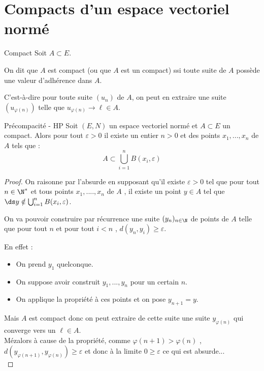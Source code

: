 \section{Compacts d'un espace vectoriel normé}

\begin{definition}{Compact}{}
    Soit $A \subset E$. 

    On dit que $A$ est compact (ou que $A$ est un compact) ssi toute suite de $A$ possède une 
    valeur d'adhérence dans $A$.

    \avspace C'est-à-dire pour toute suite $(u_n)$ de $A$, on peut en extraire une suite 
    $(u_{\varphi(n)})$ telle que $u_{\varphi(n)} \to \ell \in A$.
\end{definition}

\begin{proposition}{Précompacité - HP}{}
Soit $(E,N)$ un espace vectoriel normé et $A\subset E$ un compact.
Alors pour tout $\varepsilon >0$ il existe un entier $n>0$ et des points $x_1,...,x_n$ de $A$ tels que :
\[A \subset \bigcup_{i=1}^n B(x_i,\varepsilon)\]
\end{proposition}

\begin{proof}
On raisonne par l'absurde en supposant qu'il existe $\varepsilon>0$ tel que pour tout $n \in \N^*$ et tous points $x_1,....,x_n$ de $A$ , il existe un point $y\in A$ tel que 
$\ds y \notin \bigcup_{i=1}^n B(x_i,\varepsilon)$.

On va pouvoir construire par récurrence une suite $(y_n)_{n \in \N}$ de points de $A$ telle que pour tout $n$ et pour tout $i<n$ , $d(y_n,y_i)\geqslant \varepsilon$.

En effet :
\begin{itemize}
    \item On prend $y_1$ quelconque.
    \item On suppose avoir construit $y_1,...,y_n$ pour un certain $n$.
    \item On applique la propriété à ces points et on pose $y_{n+1}=y$.
\end{itemize}

Mais $A$ est compact donc on peut extraire de cette suite une suite $y_{\varphi(n)}$ qui converge vers un $\ell \in A$.\\
Mézalors à cause de la propriété, comme $\varphi(n+1)>\varphi(n)$ , $d(y_{\varphi(n+1)},y_{\varphi(n)})\geqslant \varepsilon$ et donc à la limite $0\geqslant \varepsilon$ ce qui est absurde...\\
\end{proof}

